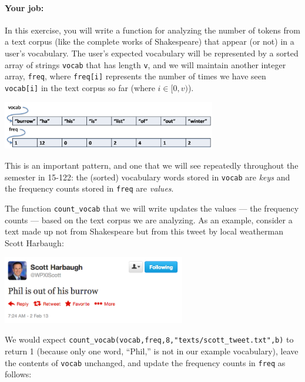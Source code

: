 \documentclass[12pt]{exam}
\begin{document}
\paragraph{Your job:}
In this exercise, you will write a function for analyzing the number
of tokens from a text corpus (like the complete works of Shakespeare)
that appear (or not) in a user's vocabulary. The user's expected
vocabulary will be represented by a sorted array of strings
\lstinline"vocab" that has length \lstinline"v", and we will maintain another
integer array, \lstinline"freq", where \lstinline"freq[i]" represents the number
of times we have seen \lstinline"vocab[i]" in the text corpus so far (where $i \in
[0,v)$).

\begin{center}
\includegraphics[width=0.7\textwidth]{img/array-before.png}
\end{center}

\noindent
This is an important pattern, and one that we will see repeatedly
throughout the semester in 15-122: the (sorted) vocabulary words
stored in \lstinline'vocab' are \emph{keys} and the frequency counts stored
in \lstinline'freq' are \emph{values}.

The function \lstinline'count_vocab' that we will write updates the values
--- the frequency counts --- based on the text corpus we are analyzing.
As an example, consider a text made up not from Shakespeare but
from this tweet by local weatherman Scott Harbaugh:

\begin{center}
\includegraphics[width=0.6\textwidth]{img/wpxiscott.png}
\end{center}

\noindent
We would expect
\lstinline'count_vocab(vocab,freq,8,"texts/scott_tweet.txt",b)' to return 1 (because
only one word, ``Phil,'' is not in our example vocabulary), leave the
contents of \lstinline'vocab' unchanged, and update the frequency counts in
\lstinline'freq' as follows:
\end{document}
